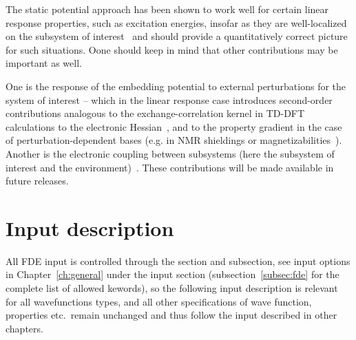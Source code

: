 The static potential approach has been shown to work well for certain linear response properties, such as 
excitation energies, insofar as they are well-localized on the subsystem of interest~\cite{actinide-Gomes-PCCP2008-10-5353,env-Hofener-JCP2013-139-104106}
and should provide a quantitatively correct picture for such situations.  Oone should keep in mind that other contributions may be important as well. 

One is the response of the embedding potential to external perturbations for the system of interest -- which in the linear response case introduces second-order contributions analogous 
to the exchange-correlation kernel in TD-DFT calculations to the electronic Hessian~\cite{env-Hofener-JCP2013-139-104106}, and to 
the property gradient in the case of perturbation-dependent bases (e.g. in NMR shieldings or magnetizabilities~\cite{env-Olejniczak-PCCP2017-19-8400}). Another is the electronic coupling 
between subsystems (here the subsystem of interest and the environment)~\cite{env-gomes-arpcspc2012-108-222,env-Hofener-JCP2012-136-044104}. 
These contributions will be made available in future releases.


\section{Input description}

All FDE input is controlled through the  section and  subsection, see input options in 
Chapter~\ref{ch:general} under the  input section (subsection~\ref{subsec:fde} for the complete list of 
allowed kewords), so the following input description is relevant for all wavefunctions types, and all other 
specifications of wave function, properties etc.\ remain unchanged and thus follow the input described in 
other chapters. 


